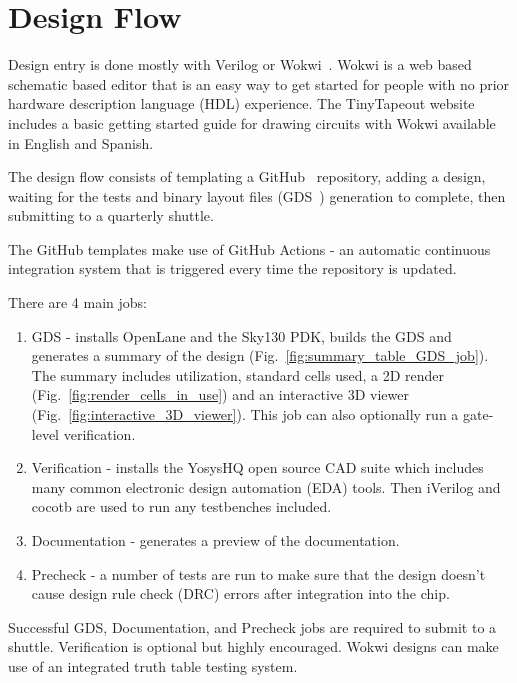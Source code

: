 \section{Design Flow}
\label{sec:design_flow}

Design entry is done mostly with Verilog or Wokwi~\cite{wokwi}.
Wokwi is a web based schematic based editor that is an easy way to get started for people with no prior hardware description language (HDL) experience.
The TinyTapeout website~\cite{tinytapeout} includes a basic getting started guide for drawing circuits with Wokwi available in English and Spanish.

The design flow consists of templating a GitHub~\cite{github} repository, adding a design, waiting for the tests and binary layout files (GDS~\cite{gds}) generation to complete, then submitting to a quarterly shuttle.

The GitHub templates\cite{verilogtemplate} make use of GitHub Actions\cite{githubactions} - an automatic continuous integration system that is triggered every time the repository is updated.

There are 4 main jobs:

\begin{enumerate}
	\item GDS - installs OpenLane\cite{openlane} and the Sky130\cite{skywaterpdk} PDK, builds the GDS and generates a summary of the design (Fig.~\ref{fig:summary_table_GDS_job}). The summary includes utilization, standard cells used, a 2D render (Fig.~\ref{fig:render_cells_in_use}) and an interactive 3D viewer (Fig.~\ref{fig:interactive_3D_viewer}).
This job can also optionally run a gate-level verification.
	\item Verification - installs the YosysHQ open source CAD suite which includes many common electronic design automation (EDA) tools.
Then iVerilog\cite{iverilog} and cocotb\cite{cocotb} are used to run any testbenches included.
	\item Documentation - generates a preview of the documentation.
	\item Precheck - a number of tests are run to make sure that the design doesn’t cause design rule check (DRC) errors after integration into the chip.
\end{enumerate}

Successful GDS, Documentation, and Precheck jobs are required to submit to a shuttle.
Verification is optional but highly encouraged. Wokwi designs can make use of an integrated truth table testing system\cite{automatedtesting}.

